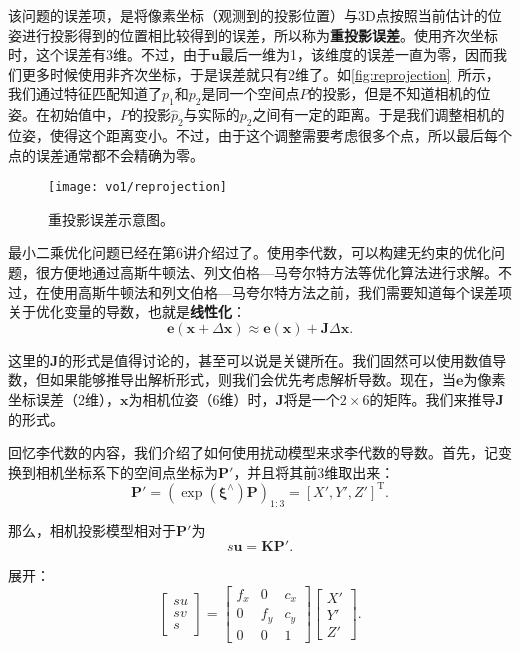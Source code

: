 该问题的误差项，是将像素坐标（观测到的投影位置）与3D点按照当前估计的位姿进行投影得到的位置相比较得到的误差，所以称为\textbf{重投影误差}。使用齐次坐标时，这个误差有3维。不过，由于${\bm{u}}$最后一维为1，该维度的误差一直为零，因而我们更多时候使用非齐次坐标，于是误差就只有2维了。如\autoref{fig:reprojection}~所示，我们通过特征匹配知道了$p_1$和$p_2$是同一个空间点$P$的投影，但是不知道相机的位姿。在初始值中，$P$的投影$\hat{p}_2$与实际的$p_2$之间有一定的距离。于是我们调整相机的位姿，使得这个距离变小。不过，由于这个调整需要考虑很多个点，所以最后每个点的误差通常都不会精确为零。

\begin{figure}[!htp]
	\centering
	\texttt{[image: vo1/reprojection]}
	\caption{重投影误差示意图。}
	\label{fig:reprojection}
\end{figure}

最小二乘优化问题已经在第6讲介绍过了。使用李代数，可以构建无约束的优化问题，很方便地通过高斯牛顿法、列文伯格—马夸尔特方法等优化算法进行求解。不过，在使用高斯牛顿法和列文伯格—马夸尔特方法之前，我们需要知道每个误差项关于优化变量的导数，也就是\textbf{线性化}：
\begin{equation}
\bm{e}( \bm{x} + \Delta \bm{x} ) \approx \bm{e}(\bm{x}) + \bm{J} \Delta \bm{x}.
\end{equation}

这里的$\bm{J}$的形式是值得讨论的，甚至可以说是关键所在。我们固然可以使用数值导数，但如果能够推导出解析形式，则我们会优先考虑解析导数。现在，当$\bm{e}$为像素坐标误差（2维），$\bm{x}$为相机位姿（6维）时，$\bm{J}$将是一个$2 \times 6$的矩阵。我们来推导$\bm{J}$的形式。

回忆李代数的内容，我们介绍了如何使用扰动模型来求李代数的导数。首先，记变换到相机坐标系下的空间点坐标为$\bm{P}'$，并且将其前3维取出来：
\begin{equation}
\bm{P}' = \left( \exp \left( {{ \bm{\xi} ^ \wedge }} \right) {\bm{P}} \right)_{1:3}= [X', Y', Z']^\mathrm{T}.
\end{equation}

那么，相机投影模型相对于$\bm{P}'$为
\begin{equation}
s {\bm{u}} = \bm{K} \bm{P}'.
\end{equation}

展开：
\begin{equation}
\left[ \begin{array}{l}
su\\
sv\\
s
\end{array} \right] = \left[ {\begin{array}{*{20}{c}}
	{{f_x}}&0&{{c_x}}\\
	0&{{f_y}}&{{c_y}}\\
	0&0&1
	\end{array}} \right]\left[ \begin{array}{l}
X'\\
Y'\\
Z'
\end{array} \right].
\end{equation}

